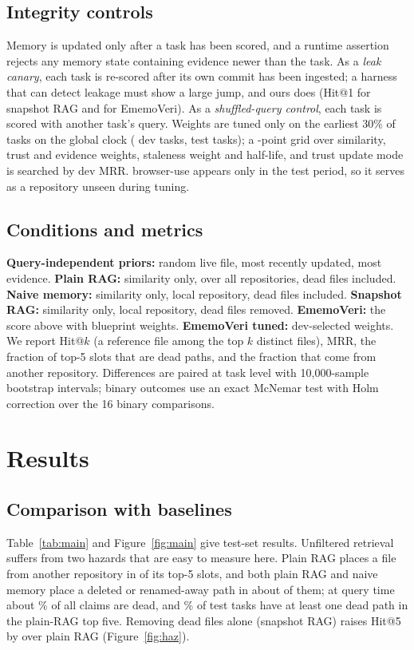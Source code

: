 \documentclass[11pt,a4paper]{article}
\newcommand{\sys}{EmemoVeri}
\begin{document}
\subsection{Integrity controls}
Memory is updated only after a task has been scored, and a runtime assertion rejects any memory state containing evidence newer than the task. As a \emph{leak canary}, each task is re-scored after its own commit has been ingested; a harness that can detect leakage must show a large jump, and ours does (Hit@1 \leakSnapOne{} for snapshot RAG and \leakEmvOne{} for \sys{}). As a \emph{shuffled-query control}, each task is scored with another task's query. Weights are tuned only on the earliest 30\% of tasks on the global clock (\nDev{} dev tasks, \nTest{} test tasks); a \gridSize{}-point grid over similarity, trust and evidence weights, staleness weight and half-life, and trust update mode is searched by dev MRR. browser-use appears only in the test period, so it serves as a repository unseen during tuning.

\subsection{Conditions and metrics}
\textbf{Query-independent priors:} random live file, most recently updated, most evidence. \textbf{Plain RAG:} similarity only, over all repositories, dead files included. \textbf{Naive memory:} similarity only, local repository, dead files included. \textbf{Snapshot RAG:} similarity only, local repository, dead files removed. \textbf{\sys{}:} the score above with blueprint weights. \textbf{\sys{} tuned:} dev-selected weights. We report Hit@$k$ (a reference file among the top $k$ distinct files), MRR, the fraction of top-5 slots that are dead paths, and the fraction that come from another repository. Differences are paired at task level with 10{,}000-sample bootstrap intervals; binary outcomes use an exact McNemar test with Holm correction over the 16 binary comparisons.

\section{Results}
\subsection{Comparison with baselines}
Table~\ref{tab:main} and Figure~\ref{fig:main} give test-set results. Unfiltered retrieval suffers from two hazards that are easy to measure here. Plain RAG places a file from another repository in \contamPlain{} of its top-5 slots, and both plain RAG and naive memory place a deleted or renamed-away path in about \deadPlain{} of them; at query time about \deadShare{}\% of all claims are dead, and \plainDeadTasks{}\% of test tasks have at least one dead path in the plain-RAG top five. Removing dead files alone (snapshot RAG) raises Hit@5 by \dSnapPlainFive{} over plain RAG (Figure~\ref{fig:haz}).
\end{document}
